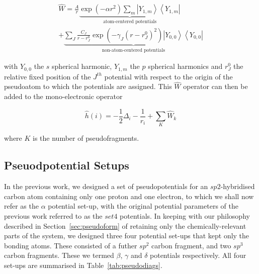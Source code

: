 \documentclass[aip,reprint,nofootinbib]{revtex4-1}
\begin{document}
\begin{multline}
\label{eq:ourPP}
\hat{W} = \frac{A}{r}
\underbrace{\exp(-\alpha r^2)\sum_m\left|Y_{1,m}\right>\left<Y_{1,m}\right|}_{\text{atom-centered potentials}}%
\\ +
\underbrace{\sum_J\frac{C_J}{r-r^{0}_J}\exp(-\gamma_J (r-r^0_J)^2)\left|Y_{0,0}\right>\left<Y_{0,0}\right|}_{\text{non-atom-centered potentials}}
\end{multline}

with $Y_{0,0}$ the $s$ spherical harmonic, $Y_{1,m}$ the $p$ spherical harmonics and $r^0_J$ the relative fixed position of the $J^{th}$ potential with respect to the origin of the pseudoatom to which the potentials are assigned. This $\hat{W}$ operator can then be added to the mono-electronic operator

\begin{equation}
\label{eq:monoElectronicOperator2}
\hat{h}(i) = -\frac{1}{2}\Delta_i - \frac{1}{r_i} + \sum_{K}{\hat{W}_k}
\end{equation}

where $K$ is the number of pseudofragments.

\subsection{Pseuodpotential Setups}

In the previous work, we designed a set of pseudopotentials for an $sp2$-hybridised carbon atom  containing only one proton and one electron, to which we shall now refer as the $\alpha$ potential set-up, with the original potential parameters of the previous work referred to as the $set4$ potentials. In keeping with our philosophy described in Section~\ref{sec:pseudoform} of retaining only the chemically-relevant parts of the system, we designed three four potential set-ups that kept only the bonding atoms. These consisted of a futher $sp^2$ carbon fragment, and two $sp^3$ carbon fragments. These we termed $\beta$, $\gamma$ and $\delta$ potentials respectively. All four set-ups are summarised in Table~\ref{tab:pseudodiags}.
\end{document}

